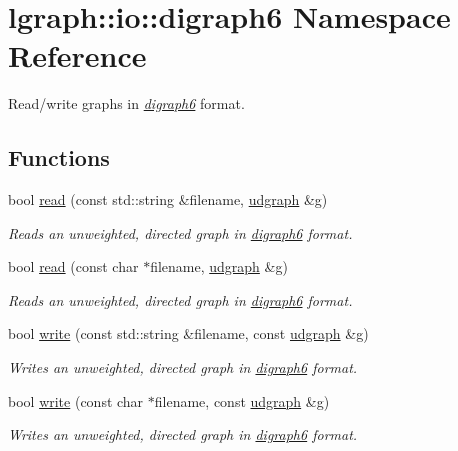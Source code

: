 \hypertarget{namespacelgraph_1_1io_1_1digraph6}{}\section{lgraph\+:\+:io\+:\+:digraph6 Namespace Reference}
\label{namespacelgraph_1_1io_1_1digraph6}


Read/write graphs in {\itshape \hyperlink{namespacelgraph_1_1io_1_1digraph6}{digraph6}} format.  


\subsection*{Functions}
\begin{DoxyCompactItemize}
\item 
bool \hyperlink{namespacelgraph_1_1io_1_1digraph6_aac580c19909a943b8b18fcba9ecb6b16}{read} (const std\+::string \&filename, \hyperlink{classlgraph_1_1udgraph}{udgraph} \&g)
\begin{DoxyCompactList}\small\item\em Reads an unweighted, directed graph in {\itshape \hyperlink{namespacelgraph_1_1io_1_1digraph6}{digraph6}} format. \end{DoxyCompactList}\item 
bool \hyperlink{namespacelgraph_1_1io_1_1digraph6_ac04dcb134c80c54ad6637d9eb8340d0d}{read} (const char $\ast$filename, \hyperlink{classlgraph_1_1udgraph}{udgraph} \&g)
\begin{DoxyCompactList}\small\item\em Reads an unweighted, directed graph in {\itshape \hyperlink{namespacelgraph_1_1io_1_1digraph6}{digraph6}} format. \end{DoxyCompactList}\item 
bool \hyperlink{namespacelgraph_1_1io_1_1digraph6_a2d1f257a3a768ab0ea3d2ba0bc96665f}{write} (const std\+::string \&filename, const \hyperlink{classlgraph_1_1udgraph}{udgraph} \&g)
\begin{DoxyCompactList}\small\item\em Writes an unweighted, directed graph in {\itshape \hyperlink{namespacelgraph_1_1io_1_1digraph6}{digraph6}} format. \end{DoxyCompactList}\item 
bool \hyperlink{namespacelgraph_1_1io_1_1digraph6_a9cf136a86f4da536fd2a18d0a135bdec}{write} (const char $\ast$filename, const \hyperlink{classlgraph_1_1udgraph}{udgraph} \&g)
\begin{DoxyCompactList}\small\item\em Writes an unweighted, directed graph in {\itshape \hyperlink{namespacelgraph_1_1io_1_1digraph6}{digraph6}} format. \end{DoxyCompactList}\end{DoxyCompactItemize}


